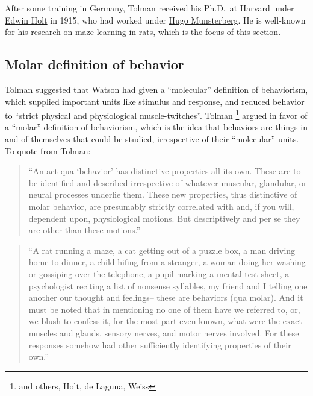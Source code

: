 \documentclass[
  oneside,
  12pt]{crumpbook}
\begin{document}
After some training in Germany, Tolman received his Ph.D.~at Harvard under \href{https://en.wikipedia.org/wiki/Edwin_Holt}{Edwin Holt} in 1915, who had worked under \href{https://en.wikipedia.org/wiki/Hugo_Münsterberg}{Hugo Munsterberg}. He is well-known for his research on maze-learning in rats, which is the focus of this section.

\hypertarget{molar-definition-of-behavior}{%
\subsection{Molar definition of behavior}\label{molar-definition-of-behavior}}

Tolman suggested that Watson had given a ``molecular'' definition of behaviorism, which supplied important units like stimulus and response, and reduced behavior to ``strict physical and physiological muscle-twitches''. Tolman \footnote{and others, Holt, de Laguna, Weiss} argued in favor of a ``molar'' definition of behaviorism, which is the idea that behaviors are things in and of themselves that could be studied, irrespective of their ``molecular'' units. To quote from Tolman:

\begin{quote}
``An act qua `behavior' has distinctive properties all its own. These are to be identified and described irrespective of whatever muscular, glandular, or neural processes underlie them. These new properties, thus distinctive of molar behavior, are presumably strictly correlated with and, if you will, dependent upon, physiological motions. But descriptively and per se they are other than these motions.''
\end{quote}

\begin{quote}
``A rat running a maze, a cat getting out of a puzzle box, a man driving home to dinner, a child hifing from a stranger, a woman doing her washing or gossiping over the telephone, a pupil marking a mental test sheet, a psychologist reciting a list of nonsense syllables, my friend and I telling one another our thought and feelings-- these are behaviors (qua molar). And it must be noted that in mentioning no one of them have we referred to, or, we blush to confess it, for the most part even known, what were the exact muscles and glands, sensory nerves, and motor nerves involved. For these responses somehow had other sufficiently identifying properties of their own.''
\end{quote}
\end{document}

